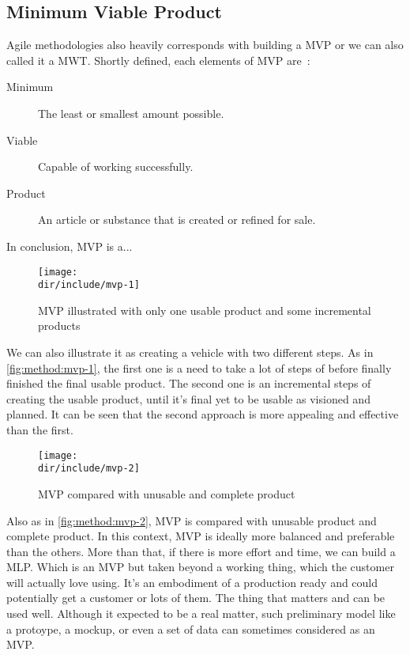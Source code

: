 
\subsection{Minimum Viable Product}

Agile methodologies also heavily corresponds with building a \ac{MVP} or we can also called it a \ac{MWT}. Shortly defined, each elements of \ac{MVP} are~\autocite{Montgomery2013MWT}:

\begin{description}
  \item[Minimum] The least or smallest amount possible.
  \item[Viable] Capable of working successfully.
  \item[Product] An article or substance that is created or refined for sale.
\end{description}

In conclusion, \ac{MVP} is a...

\begin{figure}[htb]
    \centering
    \texttt{[image: \\dir/include/mvp-1]}
    \caption[MVP illustrated]{MVP illustrated with only one usable product and some incremental products~\autocite{Mercury2014MVP}}
    \label{fig:method:mvp-1}
\end{figure}

We can also illustrate it as creating a vehicle with two different steps.
As in \autoref{fig:method:mvp-1}, the first one is a need to take a lot of steps of before finally finished the final usable product.
The second one is an incremental steps of creating the usable product, until it's final yet to be usable as visioned and planned.
It can be seen that the second approach is more appealing and effective than the first.

\begin{figure}[htb]
    \centering
    \texttt{[image: \\dir/include/mvp-2]}
    \caption[MVP compared]{MVP compared with unusable and complete product~\autocite{Mercury2014MVP}}
    \label{fig:method:mvp-2}
\end{figure}

Also as in \autoref{fig:method:mvp-2}, \ac{MVP} is compared with unusable product and complete product.
In this context, \ac{MVP} is ideally more balanced and preferable than the others.
More than that, if there is more effort and time, we can build a \ac{MLP}.
Which is an \ac{MVP} but taken beyond a working thing, which the customer will actually love using.
It's an embodiment of a production ready and could potentially get a customer or lots of them.
The thing that matters and can be used well.
Although it expected to be a real matter, such preliminary model like a protoype, a mockup, or even a set of data can sometimes considered as an \ac{MVP}.

